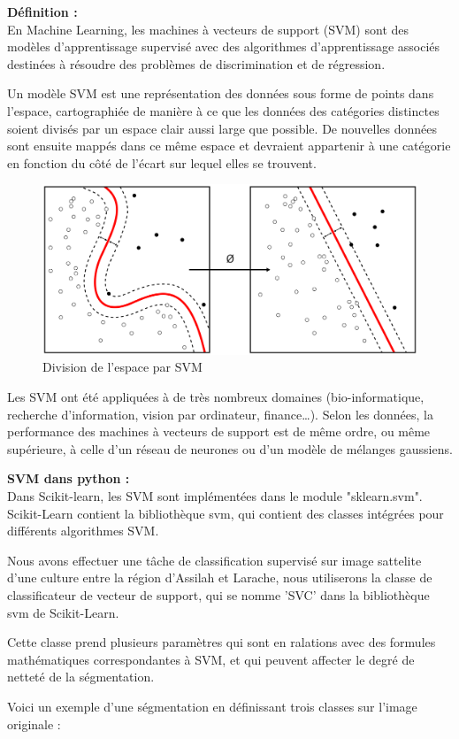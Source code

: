 \documentclass[12pt, openany]{report}
\begin{document}
\textbf{Définition :}\\
En Machine Learning, les machines à vecteurs de support (SVM) sont des modèles d'apprentissage supervisé avec des algorithmes d'apprentissage associés destinées à résoudre des problèmes de discrimination et de régression. 
\par
Un modèle SVM est une représentation des données sous forme de points dans l'espace, cartographiée de manière à ce que les données des catégories distinctes soient divisés par un espace clair aussi large que possible. De nouvelles données sont ensuite mappés dans ce même espace et devraient appartenir à une catégorie en fonction du côté de l'écart sur lequel elles se trouvent.
\begin{figure}[H]
\centering
\includegraphics[scale=0.2]{svm.png}
\caption{Division de l'espace par SVM}
\end{figure}

\par
Les SVM ont été appliquées à de très nombreux domaines (bio-informatique, recherche d'information, vision par ordinateur, finance…). Selon les données, la performance des machines à vecteurs de support est de même ordre, ou même supérieure, à celle d'un réseau de neurones ou d'un modèle de mélanges gaussiens.

\textbf{SVM dans python :} \\
Dans Scikit-learn, les SVM sont implémentées dans le module "sklearn.svm".
Scikit-Learn contient la bibliothèque svm, qui contient des classes intégrées pour différents algorithmes SVM. 
\par
Nous avons effectuer une tâche de classification supervisé sur image sattelite d'une culture entre la région d'Assilah et Larache, nous utiliserons la classe de classificateur de vecteur de support, qui se nomme 'SVC' dans la bibliothèque svm de Scikit-Learn.
\par
Cette classe prend plusieurs paramètres qui sont en ralations avec des formules mathématiques correspondantes à SVM, et qui peuvent affecter le degré de netteté de la ségmentation.
\par
Voici un exemple d'une ségmentation en définissant trois classes sur l'image originale : 
\end{document}
